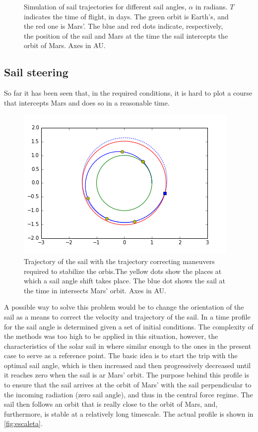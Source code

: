 \documentclass[twocolumn,12pt,a4paper]{article}
\numberwithin{equation}{section}
\begin{document}
\begin{figure}
	\caption{Simulation of sail trajectories for different sail angles, \( \alpha \) in radians. \( T \) indicates the time of flight, in days. The green orbit is Earth's, and the red one is Mars'. The blue and red dots indicate, respectively, the position of the sail and Mars at the time the sail intercepts the orbit of Mars. Axes in AU.}
	\label{fig:espirals}
\end{figure}

\subsection{Sail steering}
So far it has been seen that, in the required conditions, it is hard to plot a course that intercepts Mars and does so in a reasonable time.

\begin{figure}
	\centering
	\label{fig:maniobres}
	\includegraphics[scale=0.55]{Maniobres.png}
	\caption{Trajectory of the sail with the trajectory correcting maneuvers required to stabilize the orbis.The yellow dots show the places at which a sail angle shift takes place. The blue dot shows the sail at the time in intersects Mars' orbit. Axes in AU.}
\end{figure}

A possible way to solve this problem would be to change the orientation of the sail as a means to correct the velocity and trajectory of the sail. In \cite{xinos} a time profile for the sail angle is determined given a set of initial conditions. The complexity of the methods was too high to be applied in this situation, however, the characteristics of the solar sail in \cite{xinos} where similar enough to the ones in the present case to serve as a reference point. The basic idea is to start the trip with the optimal sail angle, which is then increased and then progressively decreased until it reaches zero when the sail is ar Mars' orbit. The purpose behind this profile is to ensure that the sail arrives at the orbit of Mars' with the sail perpendicular to the incoming radiation (zero sail angle), and thus in the central force regime. The sail then follows an orbit that is really close to the orbit of Mars, and, furthermore, is stable at a relatively long timescale. The actual profile is shown in \autoref{fig:escaleta}.
\end{document}
